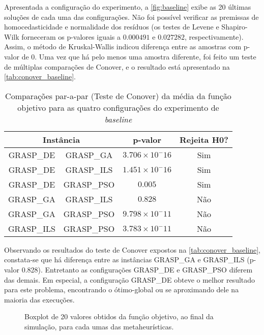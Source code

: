 Apresentada a configuração do experimento, a \autoref{fig:baseline} exibe as 20 últimas soluções de cada uma das configurações. Não foi possível verificar as premissas de homocedasticidade e normalidade dos resíduos (os testes de Levene e Shapiro-Wilk forneceram os p-valores iguais a $0.000491$ e $0.027282$, respectivamente). Assim, o método de Kruskal-Wallis indicou diferença entre as amostras com p-valor de $0$. Uma vez que há pelo menos uma amostra diferente, foi feito um teste de múltiplas comparações de Conover, e o resultado está apresentado na \autoref{tab:conover_baseline}.

\begin{table}
    \caption{Comparações par-a-par (Teste de Conover) da média da função objetivo para as quatro configurações do experimento de \textit{baseline} }
	\centering
    \begin{tabular}{cccc}
        \toprule
        \multicolumn{2}{c}{\textbf{Instância}}        &    \textbf{p-valor}       &   \textbf{Rejeita H0?}\\
        \midrule
        GRASP\_DE   &	GRASP\_GA	&	$3.706 \times 10^-16$   &   Sim \\
        GRASP\_DE	&	GRASP\_ILS	&   $1.451 \times 10^-16$   &   Sim \\
        GRASP\_DE	&	GRASP\_PSO  &   $0.005$                 &   Sim \\
        GRASP\_GA	&	GRASP\_ILS  &   $0.828$                 &   Não \\
        GRASP\_GA 	& 	GRASP\_PSO  &   $9.798 \times 10^-11$   &   Não \\
        GRASP\_ILS	&	GRASP\_PSO  &   $3.783 \times 10^-11$   &   Não \\
        \bottomrule
    \end{tabular}
    \label{tab:conover_baseline}
\end{table}

Observando os resultados do teste de Conover expostos na \autoref{tab:conover_baseline}, constata-se que há diferença entre as instâncias GRASP\_GA e GRASP\_ILS (p-valor 0.828). Entretanto as configurações GRASP\_DE e GRASP\_PSO diferem das demais. Em especial, a configuração GRASP\_DE obteve o melhor resultado para este problema, encontrando o ótimo-global ou se aproximando dele na maioria das execuções.

\begin{figure}[ht!]
\centering

\caption{Boxplot de 20 valores obtidos da  função objetivo, ao final da simulação, para cada umas das metaheurísticas.}
\label{fig:baseline}
\end{figure}

